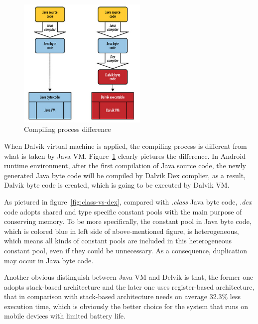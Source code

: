  \begin{figure}[!htbp]
	\centering
	\includegraphics[width=0.55\textwidth]{vm-compare.jpg}
		\caption{Compiling process difference\cite{learn_android}}
	\label{fig:vm-compare}
\end{figure}
When Dalvik virtual machine is applied, the compiling process is different from what is taken by Java VM. Figure~\ref{fig:vm-compare} clearly pictures the difference. In Android runtime environment, after the first compilation of Java source code, the newly generated Java byte code will be compiled by Dalvik Dex complier, as a result, Dalvik byte code is created, which is going to be executed by Dalvik VM.

As pictured in figure~\ref{fig:class-vs-dex}, compared with \emph{.class} Java byte code, \emph{.dex} code adopts shared and type specific constant pools with the main purpose of conserving memory\cite{android_vm}. To be more specifically,  the constant pool in Java byte code, which is colored blue in left side of above-mentioned figure, is heterogeneous, which means all kinds of constant pools are included in this heterogeneous constant pool, even if they could be unnecessary. As a consequence, duplication may occur in Java byte code.    

Another obvious distinguish between Java VM and Delvik is that, the former one adopts stack-based architecture and  the later one uses register-based architecture, that in comparison with stack-based architecture needs on average 32.3\% less execution time\cite{android_vm}, which is obviously the better choice for the system that runs on mobile devices with limited battery life.

